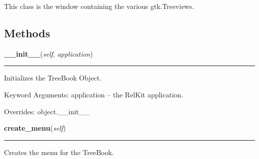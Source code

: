 This class is the window containing the various gtk.Treeviews.



  \subsection{Methods}

    \vspace{0.5ex}

\hspace{.8\funcindent}\begin{boxedminipage}{\funcwidth}

    \raggedright \textbf{\_\_init\_\_}(\textit{self}, \textit{application})

    \vspace{-1.5ex}

    \rule{\textwidth}{0.5\fboxrule}
\setlength{\parskip}{2ex}
    Initializes the TreeBook Object.

    Keyword Arguments: application -- the RelKit application.

\setlength{\parskip}{1ex}
      Overrides: object.\_\_init\_\_

    \end{boxedminipage}

    \label{reliafree:tree:TreeWindow:create_menu}

    \vspace{0.5ex}

\hspace{.8\funcindent}\begin{boxedminipage}{\funcwidth}

    \raggedright \textbf{create\_menu}(\textit{self})

    \vspace{-1.5ex}

    \rule{\textwidth}{0.5\fboxrule}
\setlength{\parskip}{2ex}
    Creates the menu for the TreeBook.

\setlength{\parskip}{1ex}
    \end{boxedminipage}

    \label{reliafree:tree:TreeWindow:create_toolbar}

